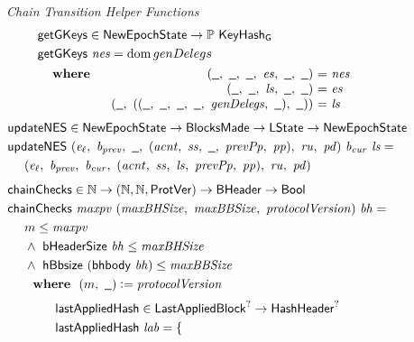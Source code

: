 \begin{figure}[htb]
  \emph{Chain Transition Helper Functions}
  \begin{align*}
      & \fun{getGKeys} \in \NewEpochState \to \powerset{\KeyHashGen} \\
      & \fun{getGKeys}~\var{nes} = \dom{genDelegs} \\
      &
      \begin{array}{lr@{~=~}l}
        \where
          & (\wcard,~\wcard,~\wcard,~\var{es},~\wcard,~\wcard)
          & \var{nes}
          \\
          & (\wcard,~\wcard,~\var{ls},~\wcard,~\wcard)
          & \var{es}
          \\
          & (\wcard,~((\wcard,~\wcard,~\wcard,~\wcard,~\var{genDelegs},~\wcard),~\wcard))
          & \var{ls}
      \end{array}
  \end{align*}
  \begin{align*}
      & \fun{updateNES} \in \NewEpochState \to \BlocksMade \to \LState \to \NewEpochState \\
      & \fun{updateNES}~
      (\var{e_\ell},~\var{b_{prev}},~\wcard,~(\var{acnt},~\var{ss},~\wcard,~\var{prevPp},~\var{pp}),
       ~\var{ru},~\var{pd})
          ~\var{b_{cur}}~\var{ls} = \\
      & ~~~~
      (\var{e_\ell},~\var{b_{prev}},~\var{b_{cur}},
       ~(\var{acnt},~\var{ss},~\var{ls},~\var{prevPp},~\var{pp}),~\var{ru},~\var{pd})
  \end{align*}
  \begin{align*}
      & \fun{chainChecks} \in \N \to (\N,\N, \ProtVer) \to \BHeader \to \Bool \\
      & \fun{chainChecks}~\var{maxpv}~(\var{maxBHSize},~\var{maxBBSize},~\var{protocolVersion})~\var{bh} = \\
      & ~~~~ m \leq \var{maxpv} \\
      & ~~~~ \land~\bHeaderSize{bh} \leq \var{maxBHSize} \\
      & ~~~~ \land~\hBbsize{(\bhbody{bh})} \leq \var{maxBBSize} \\
      & ~~~~ \where (m,~\wcard)\leteq\var{protocolVersion}
  \end{align*}
  \begin{align*}
      & \mathsf{lastAppliedHash} \in \mathsf{LastAppliedBlock}^? \to \mathsf{HashHeader}^? \\
      & \mathsf{lastAppliedHash}~\mathit{lab} =
        \begin{cases}

\end{cases}
\end{align*}
\end{figure}
